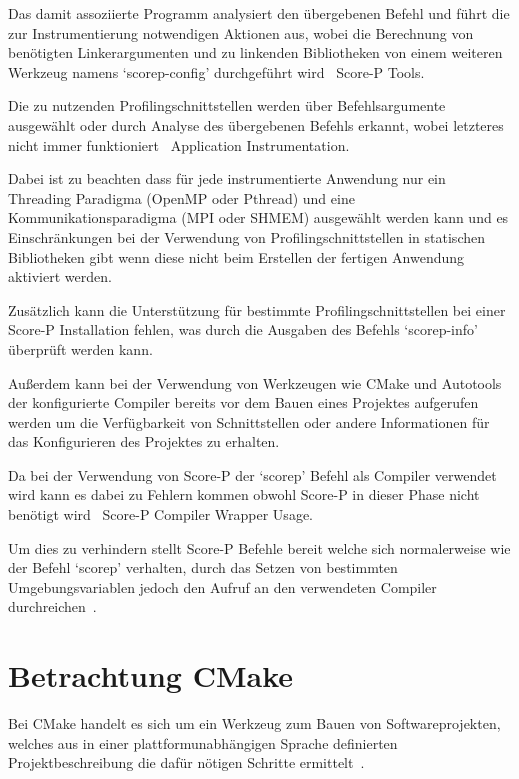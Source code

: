 \documentclass[german,proseminar,hyperref,utf8]{zihpub}
\begin{document}
    Das damit assoziierte Programm analysiert den übergebenen Befehl und führt die zur Instrumentierung
    notwendigen Aktionen aus, wobei die Berechnung von benötigten Linkerargumenten und zu linkenden
    Bibliotheken von einem weiteren Werkzeug namens `scorep-config' durchgeführt wird~
    {Score-P Tools}.

    Die zu nutzenden Profilingschnittstellen werden über Befehlsargumente ausgewählt oder durch
    Analyse des übergebenen Befehls erkannt, wobei letzteres nicht immer funktioniert~
    {Application Instrumentation}.

    Dabei ist zu beachten dass für jede instrumentierte Anwendung nur ein Threading Paradigma
    (OpenMP oder Pthread) und eine Kommunikationsparadigma (MPI oder SHMEM) ausgewählt werden kann
    und es Einschränkungen bei der Verwendung von Profilingschnittstellen in statischen
    Bibliotheken gibt wenn diese nicht beim Erstellen der fertigen Anwendung aktiviert werden.

    Zusätzlich kann die Unterstützung für bestimmte Profilingschnittstellen bei einer Score-P
    Installation fehlen, was durch die Ausgaben des Befehls `scorep-info' überprüft werden kann.

    Au{\ss}erdem kann bei der Verwendung von Werkzeugen wie CMake und Autotools der konfigurierte Compiler
    bereits vor dem Bauen eines Projektes aufgerufen werden um die Verfügbarkeit von Schnittstellen
    oder andere Informationen für das Konfigurieren des Projektes zu erhalten.

    Da bei der Verwendung von Score-P der `scorep' Befehl als Compiler verwendet wird kann es dabei
    zu Fehlern kommen obwohl Score-P in dieser Phase nicht benötigt wird~
    {Score-P Compiler Wrapper Usage}.

    Um dies zu verhindern stellt Score-P Befehle bereit welche sich normalerweise wie der Befehl
    `scorep' verhalten, durch das Setzen von bestimmten Umgebungsvariablen jedoch den Aufruf an den
    verwendeten Compiler durchreichen~.

    \newpage
    \section{Betrachtung CMake}
    Bei CMake handelt es sich um ein Werkzeug zum Bauen von Softwareprojekten, welches aus in einer
    plattformunabhängigen Sprache definierten Projektbeschreibung die dafür nötigen Schritte
    ermittelt~.
\end{document}
